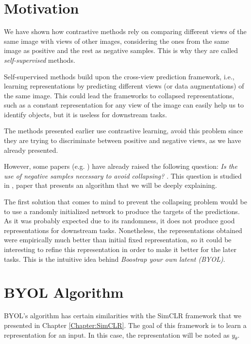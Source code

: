 \label{Chapter:BYOL}

\section{Motivation}

We have shown how contrastive methods rely on comparing different views of the same image with views of other images, considering the ones from the same image as positive and the rest as negative samples. This is why they are called \emph{self-supervised} methods.

Self-supervised methods build upon the cross-view prediction framework, i.e., learning representations by predicting different views (or data augmentations) of the same image. This could lead the frameworks to collapsed representations, such as a constant representation for any view of the image can easily help us to identify objects, but it is useless for downstream tasks.

The methods presented earlier  use contrastive learning, avoid this problem since they are trying to discriminate between positive and negative views, as we have already presented.

However, some papers (e.g. \cite{caron2019deep}) have already raised the following question: \emph{ Is the use of negative samples necessary to avoid collapsing? }. This question is studied in \cite{grill2020bootstrap}, paper that presents an algorithm that we will be deeply explaining.

The first solution that comes to mind to prevent the collapsing problem would be to use a randomly initialized network to produce the targets of the predictions. As it was probably expected due to its randomness, it does not produce good representations for downstream tasks. Nonetheless, the representations obtained were empirically much better than initial fixed representation, so it could be interesting to refine this representation in order to make it better for the later tasks. This is the intuitive idea behind \emph{Boostrap your own latent (BYOL)}.

\section{BYOL Algorithm}

BYOL's algorithm has certain similarities with the SimCLR framework that we presented in Chapter \ref{Chapter:SimCLR}. The goal of this framework is to learn a representation for an input. In this case, the representation will be noted as $y_\theta$. 

